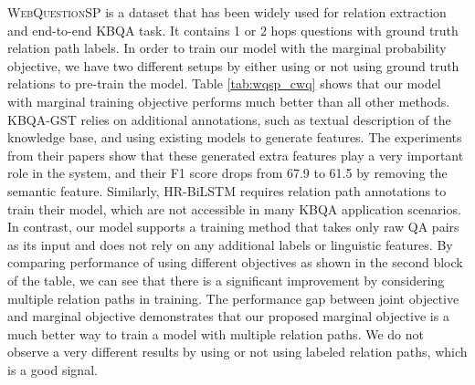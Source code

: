 \textsc{WebQuestionSP} is a dataset that has been widely used for relation extraction and end-to-end KBQA task. It contains 1 or 2 hops questions with ground truth relation path labels. In order to train our model with the marginal probability objective, we have two different setups by either using or not using ground truth relations to pre-train the model. Table \ref{tab:wqsp_cwq} shows that our model with marginal training objective performs much better than all other methods. KBQA-GST \cite{DBLP:conf/ijcai/LanW019} relies on additional annotations, such as textual description of the knowledge base, and using existing models to generate features. The experiments from their papers show that these generated extra features play a very important role in the system, and their F1 score drops from 67.9 to 61.5 by removing the semantic feature. Similarly, HR-BiLSTM requires relation path annotations to train their model, which are not accessible in many KBQA application scenarios. In contrast, our model supports a training method that takes only raw QA pairs as its input and does not rely on any additional labels or linguistic features. By comparing performance of using different objectives as shown in the second block of the table, we can see that there is a significant improvement by considering multiple relation paths in training. The performance gap between joint objective and marginal objective demonstrates that our proposed marginal objective is a much better way to train a model with multiple relation paths. We do not observe a very different results by using or not using labeled relation paths, which is a good signal. 


